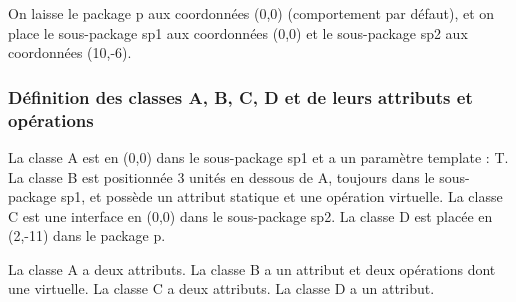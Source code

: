 \documentclass[a4paper,11pt]{report}
\newcommand{\inputTikZ}[1]{%
  }%
\newcommand{\inputTikZ}[1]{%
    \texttt{[image: fig/\#1.pdf]}%
  }%
\begin{document}
On laisse le package p aux coordonnées (0,0) (comportement par défaut), et on place le sous-package sp1 aux coordonnées (0,0) et le sous-package sp2 aux coordonnées (10,-6).

{\color{red!70!black}
\vspace{-0.4cm}
\vspace{-0.4cm}
\vspace{-0.4cm}

}

\begin{center}
\inputTikZ{classdiagstep1}
\end{center}

\subsubsection{Définition des classes A, B, C, D et de leurs attributs et opérations}

La classe A est en (0,0) dans le sous-package sp1 et a un paramètre template : T. La classe B est positionnée 3 unités en dessous de A, toujours dans le sous-package sp1, et  possède un attribut statique et une opération virtuelle. La classe C est une interface en (0,0) dans le sous-package sp2. La classe D est placée en (2,-11) dans le package p.

La classe A a deux attributs. La classe B a un attribut et deux opérations dont une virtuelle. La classe C a deux attributs. La classe D a un attribut.

\vspace{-0.4cm}
{\color{red!70!black}
\vspace{-0.4cm}
}
\vspace{-0.4cm}
{\color{red!70!black}
\vspace{-0.4cm}
}
\vspace{-0.4cm}
{\color{red!70!black}
\vspace{-0.4cm}
}

\end{document}
